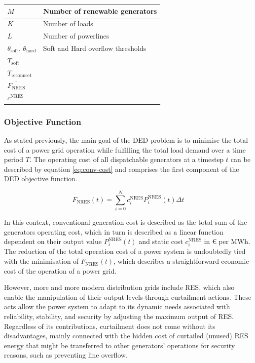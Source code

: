 \begin{center}
\begin{tabular}{ | m{2cm} | m{10cm}| }
		\hline
		$M$ & Number of renewable generators \\
		\hline
		$K$ & Number of loads \\
		\hline
		$L$ & Number of powerlines \\
		\hline
		$\theta_\text{soft}$,  $\theta_\text{hard}$ & Soft and Hard overflow thresholds \\
		\hline
		$T_\text{soft}$ & \\
		\hline
		$T_\text{reconnect}$ & \\
		\hline 
		$\overline{F_\text{NRES}}$ & \\
		\hline 
		$\overline{c^\text{NRES}}$ & \\
		\hline
	\end{tabular}
\end{center}

\subsubsection{Objective Function} \label{sec:objective-func}

As stated previously, the main goal of the \ac{DED} problem is to minimise the total cost of a power grid operation while fulfilling the total load demand over a time period $T$. The operating cost of all dispatchable generators at a timestep $t$ can be described by equation \ref{eq:conv-cost} and comprises the first component of the \ac{DED} objective function. \par

\begin{equation} \label{eq:conv-cost}
	F_\text{NRES}(t) = \sum^N_{i=0} c^\text{NRES}_i P^\text{NRES}_i(t) \Delta t
\end{equation}

In this context, conventional generation cost is described as the total sum of the generators operating cost, which in turn is described as a linear function dependent on their output value $P^\text{NRES}_i(t)$ and static cost $c^\text{NRES}_i$ in € per MWh. The reduction of the total operation cost of a power system is undoubtedly tied with the minimisation of $F_\text{NRES}(t)$, which describes a straightforward economic cost of the operation of a power grid. \par

However, more and more modern distribution grids include \acf{RES}, which also enable the manipulation of their output levels through curtailment actions. These acts allow the power system to adapt to its dynamic needs associated with reliability, stability, and security by adjusting the maximum output of \ac{RES}. Regardless of its contributions, curtailment does not come without its disadvantages, mainly connected with the hidden cost of curtailed (unused) \ac{RES} energy that might be transferred to other generators' operations for security reasons, such as preventing line overflow. \par

